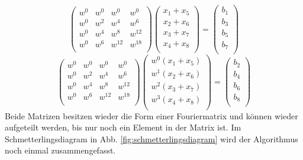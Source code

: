 \begin{equation*}
\left( \begin{array}{cccc}
w^{0} & w^{0} & w^{0} & w^{0}\\
w^{0} & w^{2} & w^{4} & w^{6}\\
w^{0} & w^{4} & w^{8} & w^{12}\\
w^{0} & w^{6} & w^{12} & w^{18}\\
\end{array} \right)
\left( \begin{array}{cccc}
x_1 + x_5\\
x_2 + x_6\\
x_3 + x_7\\
x_4 + x_8\\
\end{array} \right)
=
\left( \begin{array}{cccc}
b_1\\
b_3\\
b_5\\
b_7\\
\end{array} \right)
\end{equation*} 
\begin{equation*}
\left( \begin{array}{cccc}
w^{0} & w^{0} & w^{0} & w^{0}\\
w^{0} & w^{2} & w^{4} & w^{6}\\
w^{0} & w^{4} & w^{8} & w^{12}\\
w^{0} & w^{6} & w^{12} & w^{18}\\
\end{array} \right)
\left( \begin{array}{cccc}
w^{0}(x_1 + x_5)\\
w^{1}(x_2 + x_6)\\
w^{2}(x_3 + x_7)\\
w^{3}(x_4 + x_8)\\
\end{array} \right)
=
\left( \begin{array}{cccc}
b_2\\
b_4\\
b_6\\
b_8\\
\end{array} \right)
\end{equation*} 
Beide Matrizen besitzen wieder die Form einer Fouriermatrix und können wieder aufgeteilt werden, bis nur noch ein Element in der Matrix ist.
\newline
Im Schmetterlingsdiagram in Abb. \ref{fig:schmetterlingsdiagram} wird der Algorithmus noch einmal zusammengefasst.
